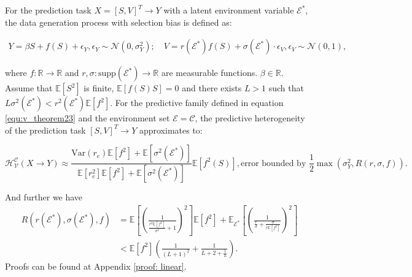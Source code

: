 	
\begin{theorem}
\label{theorem: selection-bias}
	For the prediction task $X=[S,V]^T\rightarrow Y$ with a latent environment variable $\mathcal E^*$, the data generation process with selection bias is defined as:
	\begin{small}
	\begin{align}
		Y = \beta S + f(S) + \epsilon_Y, \epsilon_Y \sim \mathcal{N}(0, \sigma_Y^2); \quad V = r(\mathcal E^*) f(S) + \sigma(\mathcal E^*)\cdot\epsilon_V, \epsilon_V \sim \mathcal{N}(0, 1),
	\end{align}
	\end{small}
	where  $f:\mathbb R\rightarrow \mathbb R$ and $r,\sigma:\text{supp}(\mathcal E^*) \rightarrow \mathbb R$ are measurable functions. $\beta \in \mathbb R$.
	Assume that $\mathbb{E}[S^2]$ is finite, $\mathbb{E}[f(S)S]=0$ and there exists $L>1$ such that $L\sigma^2(\mathcal E^*)< r^2(\mathcal E^*)\mathbb{E}[f^2]$. For the predictive family defined in equation \ref{equ:v_theorem23} and the environment set $\mathscr E = \mathcal C$, the predictive heterogeneity of the prediction task $[S,V]^T\rightarrow Y$ approximates to:
	\begin{small}
	\begin{equation}
	\label{equ:approximation1}
		\mathcal{H}^\mathcal C_{\mathcal{V}}(X\rightarrow Y) \approx \frac{\text{Var}(r_e)\mathbb{E}[f^2]+\mathbb{E}[\sigma^2(\mathcal E^*)]}{\mathbb{E}[r_e^2]\mathbb{E}[f^2]+\mathbb{E}[\sigma^2(\mathcal E^*)]}\mathbb{E}[f^2(S)], \text{error bounded by }\frac{1}{2}\max(\sigma_Y^2,R(r,\sigma,f)).
	\end{equation}	
	\end{small}
	And further we have
	\begin{equation}
		\begin{aligned}
			R(r(\mathcal E^*), \sigma(\mathcal E^*), f) &= \mathbb{E}[(\frac{1}{\frac{r^2\mathbb{E}[f^2]}{\sigma^2}+1})^2]\mathbb{E}[f^2]+ \mathbb{E}_{\mathcal{E}^*}[(\frac{1}{\frac{r}{\sigma}+\frac{\sigma}{r\mathbb{E}[f^2]}})^2]\\
			&< \mathbb{E}[f^2](\frac{1}{(L+1)^2}+\frac{1}{L+2+\frac{1}{L}}).
		\end{aligned}
	\end{equation}
	Proofs can be found at Appendix \ref{proof: linear}.
\end{theorem}

